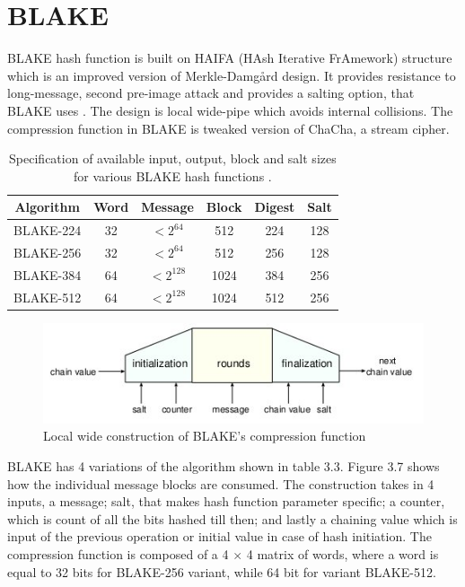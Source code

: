 \section{BLAKE} 

BLAKE \cite{00002} hash function is built on HAIFA (HAsh Iterative FrAmework) structure \cite{00020} which is an improved
version of Merkle-Damg\r{a}rd design. It provides resistance to long-message, second pre-image attack and provides a 
salting option, that BLAKE uses \cite{00021}.
The design is local wide-pipe which avoids internal collisions. The compression function in BLAKE is tweaked version of 
ChaCha, a stream cipher. 

\begin{table}[h]
  \begin{center}
    \begin{tabular}{ *{6}{c} } \hline
      Algorithm & Word & Message     & Block & Digest & Salt \\ \hline
      BLAKE-224 & 32   & $< 2^{64}$  & 512   & 224    & 128  \\
      BLAKE-256 & 32   & $< 2^{64}$  & 512   & 256    & 128  \\
      BLAKE-384 & 64   & $< 2^{128}$ & 1024  & 384    & 256  \\
      BLAKE-512 & 64   & $< 2^{128}$ & 1024  & 512    & 256  \\ \hline
    \end{tabular}
    \caption{Specification of available input, output, block and salt sizes for various BLAKE hash functions \cite{00002}.}
  \end{center}
\end{table}

\begin{figure}[h]
  \begin{center}
    \includegraphics[width=4.75in]{blakelocalwidepipeconstruction.jpg}
  \end{center}
  \caption{Local wide construction of BLAKE's compression function \cite{00002}}
  \label{fig:lab}
\end{figure}

BLAKE has 4 variations of the algorithm shown in table 3.3. Figure 3.7 shows how the individual message blocks are
consumed. The construction takes in 4 inputs, a message; salt, that makes hash function parameter specific; a
counter, which is count of all the bits hashed till then; and lastly a chaining value which is input of the previous 
operation or initial value in case of hash initiation. The compression function is composed of a 4 $\times$ 4 matrix 
of words, where a word is equal to 32 bits for BLAKE-256 variant, while 64 bit for variant BLAKE-512.

